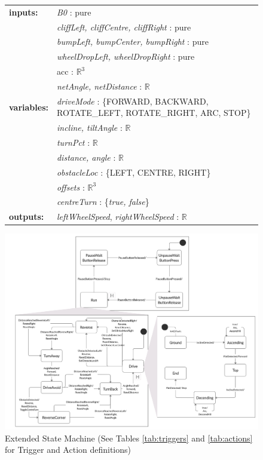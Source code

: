 \documentclass[11pt]{article}
\begin{document}
\begin{figure}[p]
    \centering
    \begin{tabular}{ll}
      \textbf{inputs:}   & \textit{B0} : pure\\
                         & \textit{cliffLeft, cliffCentre, cliffRight} : pure \\
                         & \textit{bumpLeft, bumpCenter, bumpRight} : pure \\
                         & \textit{wheelDropLeft, wheelDropRight} : pure\\
                         & acc : $\mathbb{R}^3$\\
                         & \textit{netAngle, netDistance} : $\mathbb{R}$\\
      \textbf{variables:}& \textit{driveMode} : \{FORWARD, BACKWARD, ROTATE\_LEFT, ROTATE\_RIGHT, ARC, STOP\}\\
                         & \textit{incline, tiltAngle} : $\mathbb{R}$\\
                         & \textit{turnPct} : $\mathbb{R}$\\
                         & \textit{distance, angle} : $\mathbb{R}$\\
                         & \textit{obstacleLoc} : \{LEFT, CENTRE, RIGHT\}\\
                         & \textit{offsets} : $\mathbb{R}^3$\\
                         & \textit{centreTurn} : \{\textit{true, false}\}\\
     \textbf{outputs:}   & \textit{leftWheelSpeed}, \textit{rightWheelSpeed} :  $\mathbb{R}$\\
    \end{tabular}
    \includegraphics[width=\textwidth]{Finite_State_Machine_v2}
    \caption{Extended State Machine (See Tables \ref{tab:triggers} and \ref{tab:actions} for Trigger and Action definitions)}
    \label{fig:FSM}
\end{figure}
\end{document}

